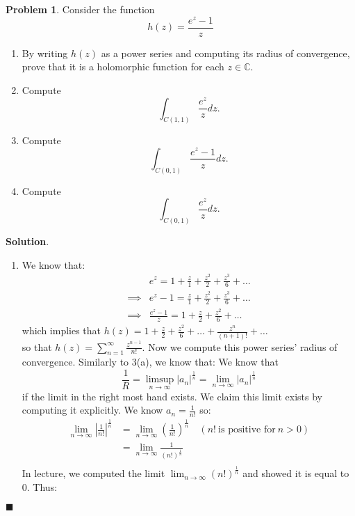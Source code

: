 \documentclass[12pt]{article}
\newcommand{\abs}[1]{\left| #1 \right|} %
\renewcommand{\=}[1]{\stackrel{#1}{=}} %
\providecommand{\CC}{\mathbb{C}}
\theoremstyle{definition}
\newtheorem{p}{Problem}[section]
\theoremstyle{definition}
\newenvironment{s}{%
        \begin{trivlist} \item \textbf{Solution}. }{%
            \hspace*{\fill} $\blacksquare$\end{trivlist}}%
\begin{document}
\newpage

\begin{p}
    Consider the function
    \[ h(z) = \frac{e^z-1}{z} \]
    \begin{enumerate}
        \item By writing $h(z)$ as a power series and computing its radius of convergence, prove that it is a holomorphic
            function for each $z\in\CC$.
        \item Compute
            \[ \int_{C(1,1)} \frac{e^z}{z}dz.\]
        \item Compute
            \[ \int_{C(0,1)} \frac{e^z-1}{z}dz.\]
        \item Compute
            \[ \int_{C(0,1)} \frac{e^z}{z}dz. \]
    \end{enumerate}
\end{p}
\begin{s}
    \begin{enumerate}
        \item We know that:
            \begin{align*}
                &e^z = 1 + \frac{z}{1} + \frac{z^2}{2} + \frac{z^3}{6} + \hdots \\
                \implies &e^z - 1 = \frac{z}{1} + \frac{z^2}{2} + \frac{z^3}{6} + \hdots \\
                \implies &\frac{e^z-1}{z} =  1 + \frac{z}{2} + \frac{z^2}{6} + \hdots
            \end{align*}
            which implies that $h(z) = 1 + \frac{z}{2} + \frac{z^2}{6} + \hdots + \frac{z^n}{(n+1)!} + \hdots$\\
            so that $h(z) = \sum_{n=1}^{\infty} \frac{z^{n-1}}{n!}$. Now we compute this power series' radius of convergence. Similarly
            to 3(a), we know that:
    We know that
    \[ \frac{1}{R} = \limsup_{n\to\infty} \abs{a_n}^{\frac{1}{n}} = \lim_{n\to\infty} \abs{a_n}^{\frac{1}{n}} \]
    if the limit in the right most hand exists. We claim this limit exists by computing it explicitly. We know $a_n = \frac{1}{n!}$ so:
    \begin{align*}
        \lim_{n\to\infty} \abs{\frac{1}{n!}}^{\frac{1}{n}} &= \lim_{n\to\infty} (\frac{1}{n!})^{\frac{1}{n}}\quad (n!\:\text{is positive for}\:n>0)\\
        &= \lim_{n\to\infty} \frac{1}{(n!)^{\frac{1}{n}}} \\
    \end{align*}
    In lecture, we computed the limit $\lim_{n\to\infty} (n!)^{\frac{1}{n}}$ and showed it is equal to 0. Thus:

\end{enumerate}
\end{s}
\end{document}
